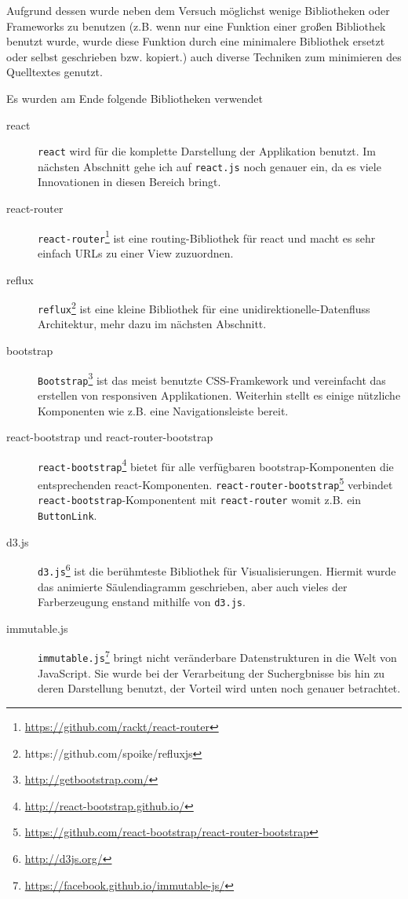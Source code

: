 \documentclass[12pt,twoside]{book}
\begin{document}
Aufgrund dessen wurde neben dem Versuch möglichst wenige Bibliotheken oder Frameworks zu benutzen (z.B. wenn nur eine Funktion einer großen Bibliothek benutzt wurde, wurde diese Funktion durch eine minimalere Bibliothek ersetzt oder selbst geschrieben bzw. kopiert.) auch diverse Techniken zum minimieren des Quelltextes genutzt.

Es wurden am Ende folgende Bibliotheken verwendet

\begin{description}
	\item[react]
		\texttt{react} wird für die komplette Darstellung der Applikation benutzt. Im nächsten Abschnitt gehe ich auf \texttt{react.js} noch genauer ein, da es viele Innovationen in diesen Bereich bringt.
	\item[react-router]
		\texttt{react-router}\footnote{\url{https://github.com/rackt/react-router}} ist eine routing-Bibliothek für react und macht es sehr einfach URLs zu einer View zuzuordnen.
	\item[reflux]
		\texttt{reflux}\footnote{https://github.com/spoike/refluxjs} ist eine kleine Bibliothek für eine unidirektionelle-Datenfluss Architektur, mehr dazu im nächsten Abschnitt.
	\item[bootstrap]
		\texttt{Bootstrap}\footnote{\url{http://getbootstrap.com/}} ist das meist benutzte CSS-Framkework und vereinfacht das erstellen von responsiven Applikationen. Weiterhin stellt es einige nützliche Komponenten wie z.B. eine Navigationsleiste bereit.
	\item[react-bootstrap und react-router-bootstrap]
		\texttt{react-bootstrap}\footnote{\url{http://react-bootstrap.github.io/}} bietet für alle verfügbaren bootstrap-Komponenten die entsprechenden react-Komponenten. \texttt{react-router-bootstrap}\footnote{\url{https://github.com/react-bootstrap/react-router-bootstrap}} verbindet \texttt{react-bootstrap}-Komponentent mit \texttt{react-router} womit z.B. ein \texttt{ButtonLink}.
	\item[d3.js]
		\texttt{d3.js}\footnote{\url{http://d3js.org/}} ist die berühmteste Bibliothek für Visualisierungen. Hiermit wurde das animierte Säulendiagramm geschrieben, aber auch vieles der Farberzeugung enstand mithilfe von \texttt{d3.js}.
	\item[immutable.js]
		\texttt{immutable.js}\footnote{\url{https://facebook.github.io/immutable-js/}} bringt nicht veränderbare Datenstrukturen in die Welt von JavaScript. Sie wurde bei der Verarbeitung der Suchergbnisse bis hin zu deren Darstellung benutzt, der Vorteil wird unten noch genauer betrachtet.

\end{description}
\end{document}
